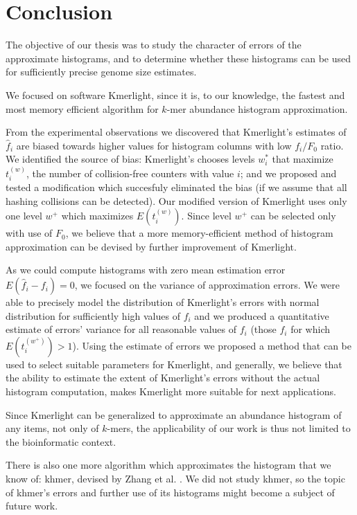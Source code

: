 \chapter*{Conclusion}

The objective of our thesis was to study the character of errors
of the approximate histograms, and to determine whether these histograms
can be used for sufficiently precise genome size estimates.

\medskip
We focused on software Kmerlight, since it 
is, to our knowledge, the fastest and most memory efficient algorithm for
$k$-mer abundance histogram approximation. 

From the experimental observations we discovered that Kmerlight's estimates 
of $\hat f_i$ are biased towards higher values for histogram columns
with low $f_i / F_0$ ratio. We identified the source of bias: Kmerlight's
chooses levels $w_i^*$ that maximize $t_i^{(w)}$, the number of collision-free
counters with value $i$; and we proposed and tested a modification which succesfuly
eliminated the bias (if we assume that all hashing collisions can be detected). 
Our modified version of Kmerlight uses only one level $w^+$ which
maximizes $E(t_i^{(w)})$. Since level $w^+$ can be selected only with use of $F_0$,
we believe that a more memory-efficient method of histogram approximation can be devised by
further improvement of Kmerlight. 

As we could compute histograms with zero mean estimation error $E(\hat f_i - f_i) = 0$,
we focused on the variance of approximation errors. We were able to precisely model the
distribution of Kmerlight's errors with normal distribution for sufficiently high values of
$f_i$ and we produced a quantitative estimate of errors' variance for all reasonable values of $f_i$
(those $f_i$ for which $E(t_i^{(w^+)}) > 1$). Using the estimate of errors we proposed a method
that can be used to select suitable parameters for Kmerlight, and generally, we believe that the 
ability to estimate the extent of Kmerlight's errors without the actual histogram computation, 
makes Kmerlight more suitable for next applications.

Since Kmerlight can be generalized to approximate an abundance histogram of any items,
not only of $k$-mers, the applicability of our work is thus not limited to the
bioinformatic context. 

There is also one more algorithm which approximates the histogram that we know of: khmer,
devised by Zhang et al. \cite{Zhang2014}. We did not study khmer, so the topic of khmer's errors 
and further use of its histograms might become a subject of future work.

